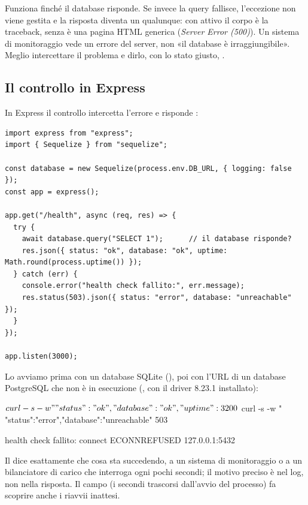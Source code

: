 Funziona finché il database risponde. Se invece la query fallisce, l'eccezione
non viene gestita e la risposta diventa un  qualunque: con
 attivo il corpo è la traceback, senza è una pagina HTML generica
(\textit{Server Error (500)}). Un sistema di monitoraggio vede un errore del
server, non «il database è irraggiungibile». Meglio intercettare il problema e
dirlo, con lo stato giusto, .

\subsection{Il controllo in Express}

In Express il controllo intercetta l'errore e risponde :

\begin{lstlisting}[style=js, name=salute.js]
import express from "express";
import { Sequelize } from "sequelize";

const database = new Sequelize(process.env.DB_URL, { logging: false });
const app = express();

app.get("/health", async (req, res) => {
  try {
    await database.query("SELECT 1");      // il database risponde?
    res.json({ status: "ok", database: "ok", uptime: Math.round(process.uptime()) });
  } catch (err) {
    console.error("health check fallito:", err.message);
    res.status(503).json({ status: "error", database: "unreachable" });
  }
});

app.listen(3000);
\end{lstlisting}

Lo avviamo prima con un database SQLite
(), poi con l'URL di un
database PostgreSQL che non è in esecuzione
(, con il driver
 8.23.1 installato):

\begin{console}[Terminale]
$ curl -s -w " %
{"status":"ok","database":"ok","uptime":3} 200
$ curl -s -w " %
{"status":"error","database":"unreachable"} 503
\end{console}

\begin{console}
health check fallito: connect ECONNREFUSED 127.0.0.1:5432
\end{console}

Il  dice esattamente che cosa sta succedendo, a un sistema di
monitoraggio o a un bilanciatore di carico che interroga  ogni
pochi secondi; il motivo preciso è nel log, non nella risposta. Il campo
 (i secondi trascorsi dall'avvio del processo) fa scoprire anche i
riavvii inattesi.

